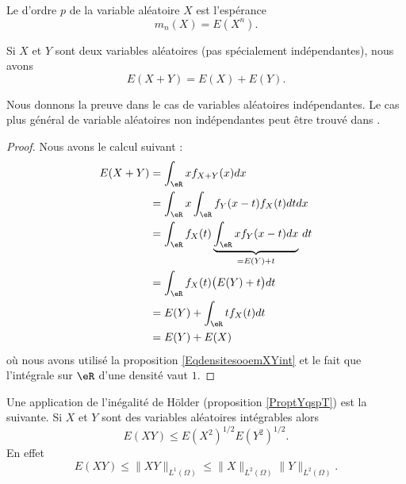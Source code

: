 Le  d'ordre \( p\) de la variable aléatoire \( X\) est l'espérance
\begin{equation}
    m_n(X)=E(X^n).
\end{equation}

\begin{proposition}
    Si \( X\) et \( Y\) sont deux variables aléatoires (pas spécialement indépendantes), nous avons
    \begin{equation}
        E(X+Y)=E(X)+E(Y).
    \end{equation}
\end{proposition}

Nous donnons la preuve dans le cas de variables aléatoires indépendantes. Le cas plus général de variable aléatoires non indépendantes peut être trouvé dans \cite{Marazzi}.
\begin{proof}
    Nous avons le calcul suivant :
    \begin{subequations}
        \begin{align}
            E(X+Y)&=\int_{\eR}xf_{X+Y}(x)dx\\
            &=\int_{\eR}x\int_{\eR}f_Y(x-t)f_X(t)dtdx\\
            &=\int_{\eR}f_X(t)\underbrace{\int_{\eR}xf_Y(x-t)dx}_{=E(Y)+t}\,dt\\
            &=\int_{\eR}f_X(t)\big( E(Y)+t \big)dt\\
            &=E(Y)+\int_{\eR}tf_X(t)dt\\
            &=E(Y)+E(X)
        \end{align}
    \end{subequations}
    où nous avons utilisé la proposition \ref{EqdensitesooemXYint} et le fait que l'intégrale sur \( \eR\) d'une densité vaut \( 1\).
\end{proof}

Une application de l'inégalité de Hölder (proposition \ref{ProptYqspT}) est la suivante. Si \( X\) et \( Y\) sont des variables aléatoires intégrables alors
\begin{equation}
    E(XY)\leq E(X^2)^{1/2}E(Y^2)^{1/2}.
\end{equation}
En effet
\begin{equation}    \label{EqEXYleqXdYdNormHolder}
    E(XY)\leq \| XY \|_{L^1(\Omega)}\leq \| X \|_{L^2(\Omega)}\| Y \|_{L^2(\Omega)}.
\end{equation}

